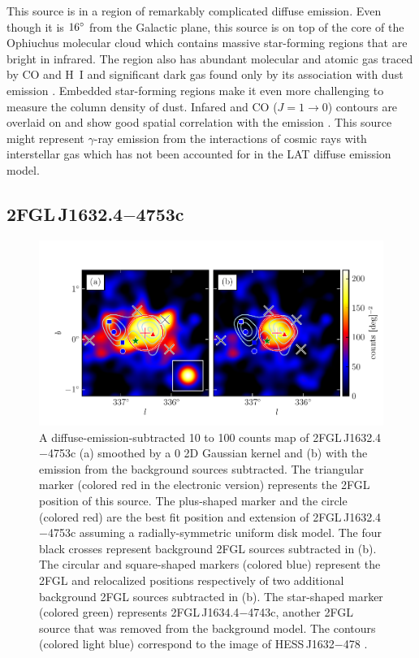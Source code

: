 This source is in a region of remarkably complicated diffuse emission.
Even though it is $16^\circ$ from the Galactic plane, this source
is on top of the core of the Ophiuchus molecular cloud which
contains massive star-forming regions that are bright in infrared.
The region also has abundant molecular and atomic gas traced by CO
and H~I and significant dark gas found only by its association with
dust emission \citep{grenier_2005a_unveiling-extensive}. Embedded
star-forming regions make it even more challenging to measure
the column density of dust.  Infared and CO ($J=1\rightarrow
0$) contours are overlaid on 
and show good spatial correlation with the \gev emission
\citep{young_1986a_high-resolution-observations,de-geus_1990a_survey-clouds}.
This source might represent $\gamma$-ray emission from the interactions
of cosmic rays with interstellar gas which has not been accounted for
in the LAT diffuse emission model.

\subsection{2FGL\,J1632.4$-$4753c}

\begin{figure}[htbp]
  \includegraphics{chapters/extended_search/figures/source_plots/source_HESS_J1632-478_color.pdf}
  \caption{A diffuse-emission-subtracted 10 \gev to 100 \gev counts map
  of 2FGL\,J1632.4$-$4753c (a) smoothed by a 0 2D Gaussian kernel
  and (b) with the emission from the background sources subtracted.
  The triangular marker (colored red in the electronic version)
  represents the 2FGL position of this source.  The plus-shaped marker
  and the circle (colored red) are the best fit position and extension of
  2FGL\,J1632.4$-$4753c assuming a radially-symmetric uniform disk model.
  The four black crosses represent background 2FGL sources subtracted in
  (b).  The circular and square-shaped markers (colored blue) represent
  the 2FGL and relocalized positions respectively of two additional
  background 2FGL sources subtracted in (b).  The star-shaped marker
  (colored green) represents 2FGL\,J1634.4$-$4743c, another 2FGL
  source that was removed from the background model.  The contours
  (colored light blue) correspond to the \tev image of HESS\,J1632$-$478
  \citep{aharonian_2006a_h.e.s.s.-survey}.}
\end{figure}

